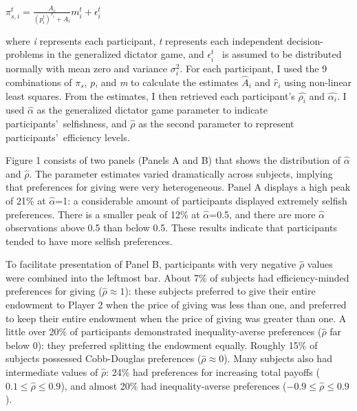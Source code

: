 \documentclass[12pt]{article}
\begin{document}
\vspace{3mm} \( \pi^{t}_{s,i} = \frac{A_{i}}{(p^{t}_{i})^{r_{i}} + A_{i}}m^{t}_{i} + \epsilon^{t}_{i}\)
 
\vspace{3mm} \noindent where \textit{i} represents each participant, \textit{t} represents each independent decision-problems in the generalized dictator game, and \( \epsilon^{t}_{i} \) \ is assumed to be distributed normally with mean zero and variance \(\sigma^{2}_{i}\). For each participant, I used the 9 combinations of \(\pi_{s}\), \(p\), and \textit{m} to calculate the estimates  \( \hat{A}_{i} \) and \( \hat{r}_{i} \) using non-linear least squares. From the estimates, I then retrieved each participant\rq s \( \hat{\rho_{i}}\) and \( \hat{\alpha_{i}} \). I used \(\hat{\alpha}\) as the generalized dictator game parameter to indicate participants\rq \ selfishness, and \(\hat{\rho}\) as the second parameter to represent participants\rq \ efficiency levels.

Figure 1 consists of two panels (Panels A and B) that shows the distribution of  \(\hat{\alpha}\) and \(\hat{\rho}\). The parameter estimates varied dramatically across subjects, implying that preferences for giving were very heterogeneous. Panel A displays a high peak of 21\% at \(\hat{\alpha}\)=1: a considerable amount of participants displayed extremely selfish preferences. There is a smaller peak of 12\% at \(\hat{\alpha}\)=0.5, and there are more \(\hat{\alpha}\) observations above 0.5 than below 0.5. These results indicate that participants tended to have more selfish preferences. 

To facilitate presentation of Panel B, participants with very negative \(\hat{\rho}\) values were combined into the leftmost bar. About 7\% of subjects had efficiency-minded preferences for giving (\(\hat{\rho} \approx 1\)): these subjects preferred to give their entire endowment to Player 2 when the price of giving was less than one, and preferred to keep their entire endowment when the price of giving was greater than one. A little over 20\% of participants demonstrated inequality-averse preferences (\(\hat{\rho}\) far below 0): they preferred splitting the endowment equally. Roughly 15\% of subjects possessed Cobb-Douglas preferences (\(\hat{\rho} \approx 0\)). Many subjects also had intermediate values of \(\hat{\rho}\): 24\% had preferences for increasing total payoffs (\(0.1 \leq \hat{\rho} \leq 0.9\)), and almost 20\% had inequality-averse preferences (\(-0.9 \leq \hat{\rho} \leq 0.9\)).
\end{document}
